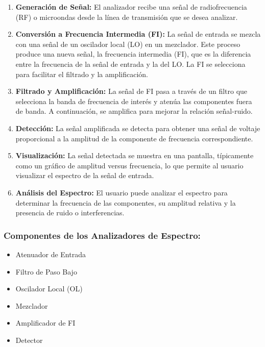             \begin{enumerate}
                \item \textbf{Generación de Señal:} El analizador recibe una señal de radiofrecuencia (RF) o microondas desde la línea de transmisión que se desea analizar.
                \item \textbf{Conversión a Frecuencia Intermedia (FI):} La señal de entrada se mezcla con una señal de un oscilador local (LO) en un mezclador. Este proceso produce una nueva señal, la frecuencia intermedia (FI), que es la diferencia entre la frecuencia de la señal de entrada y la del LO. La FI se selecciona para facilitar el filtrado y la amplificación.
                \item \textbf{Filtrado y Amplificación:} La señal de FI pasa a través de un filtro que selecciona la banda de frecuencia de interés y atenúa las componentes fuera de banda. A continuación, se amplifica para mejorar la relación señal-ruido.
                \item \textbf{Detección:} La señal amplificada se detecta para obtener una señal de voltaje proporcional a la amplitud de la componente de frecuencia correspondiente.
                \item \textbf{Visualización:} La señal detectada se muestra en una pantalla, típicamente como un gráfico de amplitud versus frecuencia, lo que permite al usuario visualizar el espectro de la señal de entrada.
                \item \textbf{Análisis del Espectro:} El usuario puede analizar el espectro para determinar la frecuencia de las componentes, su amplitud relativa y la presencia de ruido o interferencias.
            \end{enumerate}

        \subsubsection*{Componentes de los Analizadores de Espectro:}

            \begin{itemize}
                \item Atenuador de Entrada
                \item Filtro de Paso Bajo
                \item Oscilador Local (OL)
                \item Mezclador
                \item Amplificador de FI
                \item Detector
            \end{itemize}

